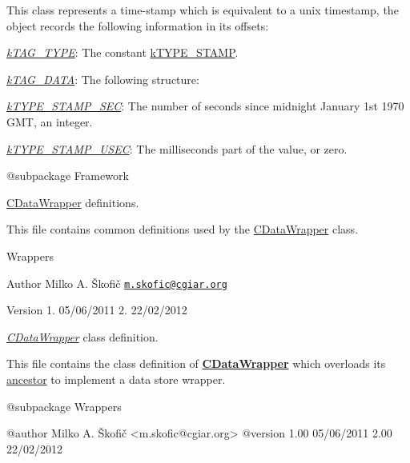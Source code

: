 This class represents a time-\/stamp which is equivalent to a unix timestamp, the object records the following information in its offsets\-:


\begin{DoxyItemize}
\item {\itshape \hyperlink{}{k\-T\-A\-G\-\_\-\-T\-Y\-P\-E}}\-: The constant \hyperlink{}{k\-T\-Y\-P\-E\-\_\-\-S\-T\-A\-M\-P}. 
\item {\itshape \hyperlink{}{k\-T\-A\-G\-\_\-\-D\-A\-T\-A}}\-: The following structure\-: 
\begin{DoxyItemize}
\item {\itshape \hyperlink{}{k\-T\-Y\-P\-E\-\_\-\-S\-T\-A\-M\-P\-\_\-\-S\-E\-C}}\-: The number of seconds since midnight January 1st 1970 G\-M\-T, an integer. 
\item {\itshape \hyperlink{}{k\-T\-Y\-P\-E\-\_\-\-S\-T\-A\-M\-P\-\_\-\-U\-S\-E\-C}}\-: The milliseconds part of the value, or zero. 
\end{DoxyItemize}
\end{DoxyItemize}

\begin{DoxyVerb} @subpackage        Framework\end{DoxyVerb}


\hyperlink{class_c_data_wrapper}{C\-Data\-Wrapper} definitions.

This file contains common definitions used by the \hyperlink{class_c_data_wrapper}{C\-Data\-Wrapper} class.

Wrappers

\begin{DoxyAuthor}{Author}
Milko A. Škofič \href{mailto:m.skofic@cgiar.org}{\tt m.\-skofic@cgiar.\-org} 
\end{DoxyAuthor}
\begin{DoxyVersion}{Version}
1. 05/06/2011 2. 22/02/2012
\end{DoxyVersion}
{\itshape \hyperlink{class_c_data_wrapper}{C\-Data\-Wrapper}} class definition.

This file contains the class definition of {\bfseries \hyperlink{class_c_data_wrapper}{C\-Data\-Wrapper}} which overloads its \hyperlink{class_c_wrapper}{ancestor} to implement a data store wrapper.

\begin{DoxyVerb} @subpackage        Wrappers

 @author            Milko A. Škofič <m.skofic@cgiar.org>
 @version   1.00 05/06/2011
                    2.00 22/02/2012\end{DoxyVerb}


